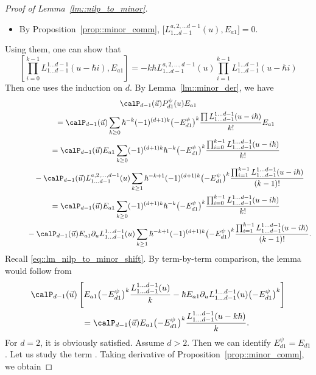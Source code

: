 \begin{proof}[Proof of Lemma~\ref{lm::nilp_to_minor}]
\begin{itemize}
			\item By Proposition~\ref{prop::minor_comm},
$\bigl[L^{a,2,\dots d-1}_{1 \dots d-1}(u),E_{a1}\bigr] = 0$.
		\end{itemize}
		Using them, one can show that
		\[
		\left[\prod\limits_{i=0}^{k-1} L_{1\dots d-1}^{1\dots d-1}(u - \hbar i),E_{a1}\right] = -k\hbar L_{1\dots d-1}^{a,2,\dots,d-1}(u) \prod\limits_{i=1}^{k-1} L_{1\dots d-1}^{1\dots d-1}(u-\hbar i)
		\]
		Then one uses the induction on $d$. By Lemma~\ref{lm::minor_der}, we have
		\begin{gather*}
			 \calP_{d-1}(\vec{u})P_{d1}^{\psi}(u) E_{a1} \\
			\qquad= \calP_{d-1}(\vec{u})\sum\limits_{k\geq 0} \hbar^{-k} (-1)^{(d+1)k} \bigl(-E_{d1}^{\psi}\bigr)^k \frac{\prod L_{1\dots d-1}^{1\dots d-1}(u-i\hbar)}{k!} E_{a1} \\
			\qquad= \calP_{d-1}(\vec{u})E_{a1} \sum\limits_{k\geq 0} (-1)^{(d+1)k} \hbar^{-k} \bigl(-E_{d1}^{\psi}\bigr)^k \frac{\prod_{i=0}^{k-1} L_{1\dots d-1}^{1\dots d-1}(u-i\hbar)}{k!} \\
			\phantom{\qquad=}- \calP_{d-1}(\vec{u}) L_{1\dots d-1}^{a,2,\dots,d-1}(u) \sum\limits_{k\geq 1} \hbar^{-k+1} (-1)^{(d+1)k} \bigl(-E_{d1}^{\psi}\bigr)^k \frac{\prod_{i=1}^{k-1} L_{1\dots d-1}^{1\dots d-1}(u-i\hbar)}{(k-1)!} \\
			\qquad= \calP_{d-1}(\vec{u})E_{a1} \sum\limits_{k\geq 0} (-1)^{(d+1)k} \hbar^{-k} \bigl(-E_{d1}^{\psi}\bigr)^k \frac{\prod_{i=0}^{k-1} L_{1\dots d-1}^{1\dots d-1}(u-i\hbar)}{k!} \\
		\phantom{\qquad=}	- \calP_{d-1}(\vec{u}) E_{a1} \partial_u L_{1\dots d-1}^{1\dots d-1}(u) \sum\limits_{k\geq 1} \hbar^{-k+1} (-1)^{(d+1)k} \bigl(-E_{d1}^{\psi}\bigr)^k \frac{\prod_{i=1}^{k-1} L_{1\dots d-1}^{1\dots d-1}(u-i\hbar)}{(k-1)!}.
		\end{gather*}
		Recall \eqref{eq::lm_nilp_to_minor_shift}. By term-by-term comparison, the lemma would follow from
		\begin{gather}
				\calP_{d-1}(\vec{u})\left[ E_{a1} \bigl(-E_{d1}^{\psi}\bigr)^k \frac{L_{1\dots d-1}^{1\dots d-1}(u)}{k} - \hbar E_{a1} \partial_u L_{1\dots d-1}^{1\dots d-1}(u) \bigl(-E_{d1}^{\psi}\bigr)^k \right] \nonumber \\
				\qquad=\calP_{d-1}(\vec{u}) E_{a1} \bigl(-E_{d1}^{\psi}\bigr)^k \frac{L_{1\dots d-1}^{1\dots d-1}(u-k\hbar)}{k}.		\label{eq::taylor_form}
		\end{gather}
		For $d=2$, it is obviously satisfied. Assume $d>2$. Then we can identify $E_{d1}^{\psi} = E_{d1}$. Let us study the term . Taking derivative of Proposition~\ref{prop::minor_comm}, we obtain

\end{proof}
